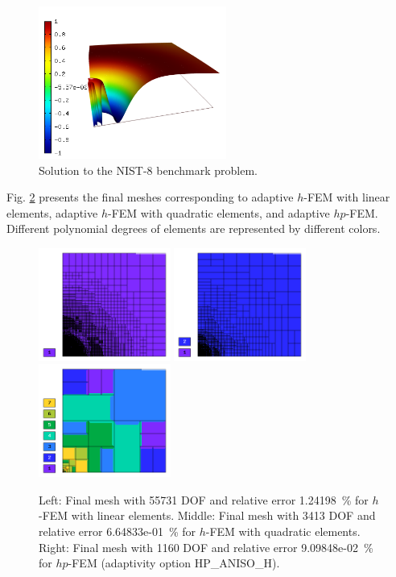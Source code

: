\documentclass[12pt]{elsarticle}
\begin{document}
\begin{figure}[H]
\centering
\vspace{-3mm}
\includegraphics[height=5cm]{nist/nist-8/solution.png}
\vspace{-3mm}
\caption{Solution to the NIST-8 benchmark problem.}
\vspace{-4mm}
\label{fig:sln-nist08}
\end{figure}


Fig. \ref{fig:nist-8-hp-aniso} presents the final meshes corresponding to adaptive $h$-FEM with 
linear elements, adaptive $h$-FEM with quadratic elements, and adaptive $hp$-FEM. Different 
polynomial degrees of elements are represented by different colors. 

\begin{figure}[H]
\centering
\includegraphics[height=3.7cm]{nist/nist-8/mesh_h1_aniso.png}
\includegraphics[height=3.7cm]{nist/nist-8/mesh_h2_aniso.png}
\includegraphics[height=3.7cm]{nist/nist-8/mesh_hp_aniso.png}
\caption{
Left: Final mesh with 55731 DOF and relative error 1.24198~\% for $h$-FEM with linear elements.
Middle: Final mesh with 3413 DOF and relative error 6.64833e-01~\% for $h$-FEM with quadratic elements. 
Right: Final mesh with 1160 DOF and relative error 9.09848e-02~\% for $hp$-FEM (adaptivity option HP\_ANISO\_H).}
\label{fig:nist-8-hp-aniso}
\end{figure}
\end{document}
